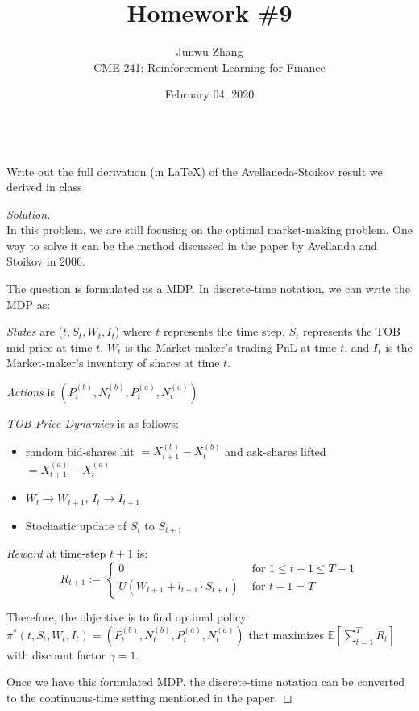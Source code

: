 \documentclass[12pt]{article}
\date{February 04, 2020}
\newenvironment{problem}[2][Problem]{\begin{trivlist}
\item[\hskip \labelsep {\bfseries #1}\hskip \labelsep {\bfseries #2.}]}{\end{trivlist}}
\newenvironment{solution}
  {\renewcommand\qedsymbol{$\blacksquare$}\begin{proof}[Solution]}
  {\end{proof}}
\begin{document}
 
\title{Homework \#9}
\author{Junwu Zhang\\ 
CME 241: Reinforcement Learning for Finance \\}
\maketitle

\begin{problem}{1}
\text{ }\\
Write out the full derivation (in LaTeX) of the Avellaneda-Stoikov result we derived in class
\end{problem}
\begin{solution}
\text{ }\\
In this problem, we are still focusing on the optimal market-making problem. One way to solve it can be the method discussed in the paper by Avellanda and Stoikov in 2006. 

The question is formulated as a \gls{MDP}. In discrete-time notation, we can write the \gls{MDP} as:

\textit{States} are ($t, S_t, W_t, I_t$) where $t$ represents the time step, $S_t$ represents the \gls{TOB} mid price at time $t$, $W_t$ is the Market-maker's trading \gls{PnL} at time $t$, and $I_t$ is the Market-maker’s inventory of shares at time $t$. 

\textit{Actions} is $(P_t^{(b)}, N_t^{(b)}, P_t^{(a)}, N_t^{(a)})$

\textit{\gls{TOB} Price Dynamics} is as follows: 
\begin{itemize}[noitemsep]
\item random bid-shares hit $ = X_{t+1}^{(b)} - X_t^{(b)}$ and ask-shares lifted $ = X_{t+1}^{(a)} - X_t^{(a)}$
\item $W_t \rightarrow W_{t+1}$, $I_t \rightarrow I_{t+1}$
\item Stochastic update of $S_t$ to $S_{t+1}$
\end{itemize}

\textit{Reward} at time-step $t+1$ is:
\begin{equation}
R_{t+1}:=\left\{\begin{array}{ll}
0 & \text { for } 1 \leq t+1 \leq T-1 \\
U\left(W_{t+1}+l_{t+1} \cdot S_{t+1}\right) & \text { for } t+1=T
\end{array}\right.
\end{equation}

Therefore, the objective is to find optimal policy $\pi^*(t, S_t, W_t, I_t) = (P_t^{(b)}, N_t^{(b)}, P_t^{(a)}, N_t^{(a)})$ that maximizes $\mathbb{E}[\sum_{t=1}^{T} R_t]$ with discount factor $\gamma=1$. 

Once we have this formulated \gls{MDP}, the discrete-time notation can be converted to the continuous-time setting mentioned in the paper. 

\end{solution}
\end{document}
